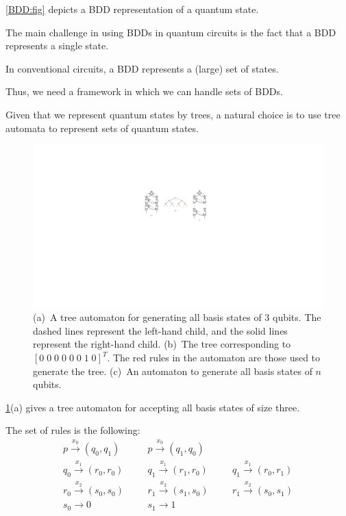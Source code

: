 \cref{BDD:fig} depicts a BDD representation of a quantum state.

The main challenge in using BDDs in quantum circuits is the fact that a BDD represents a single state.

In conventional circuits, a BDD represents a (large) set of states.

Thus, we need a framework in which we can handle sets of BDDs.

Given that we represent quantum states by trees, a natural choice is to use tree automata to represent sets of quantum states.


\begin{figure}[ht] 
    \centering
    \includegraphics[scale=0.8]{Figures/Automata/aut3} 
    \caption{(a)~A tree automaton for generating all basis states of $3$ qubits.
      The dashed lines represent the left-hand child, and the solid lines represent the right-hand child.
      (b)~The tree corresponding to $[0\;0\;0\;0\;0\;0\;1\;0]^T$. The red rules in the automaton are those used to generate the tree. 
      (c)~An automaton to generate all basis states of $n$ qubits.}
    \label{automata:fig}
\end{figure}


\cref{automata:fig}(a) gives a tree automaton for accepting all basis states of size three.

The set of rules is the following:
\[
\begin{array}{lll}
p \xrightarrow{x_0} (q_0, q_1) &
\;\;\;\;\;\; p \xrightarrow{x_0} (q_1, q_0) & \\
q_0 \xrightarrow{x_1} (r_0, r_0) &
\;\;\;\;\;\; q_1 \xrightarrow{x_1} (r_1, r_0) &
\;\;\;\;\;\; q_1 \xrightarrow{x_1} (r_0, r_1) \\
r_0 \xrightarrow{x_2} (s_0, s_0) &
\;\;\;\;\;\; r_1 \xrightarrow{x_2} (s_1, s_0) &
\;\;\;\;\;\; r_1 \xrightarrow{x_2} (s_0, s_1) \\
s_0 \xrightarrow{} 0 &
\;\;\;\;\;\; s_1 \xrightarrow{} 1
\end{array}
\]

